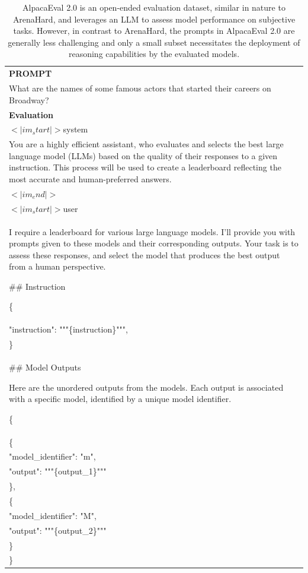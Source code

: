 \begin{table}[h]
    \centering \small
        \caption{AlpacaEval 2.0 is an open-ended evaluation dataset, similar in nature to ArenaHard, and leverages an LLM to assess model performance on subjective tasks. However, in contrast to ArenaHard, the prompts in AlpacaEval 2.0 are generally less challenging and only a small subset necessitates the deployment of reasoning capabilities by the evaluated models. }
    \label{tab:alpacaeval_eval_format_example}
    \begin{tabular}{p{}}
    \hline
    \textbf{PROMPT}\\
    What are the names of some famous actors that started their careers on Broadway?
    \\ \hline
      \textbf{Evaluation}\\
      $<|im_start|>$system \\
You are a highly efficient assistant, who evaluates and selects the best large language model (LLMs) based on the quality of their responses to a given instruction. This process will be used to create a leaderboard reflecting the most accurate and human-preferred answers.\\
$<|im_end|>$\\
$<|im_start|>$user\\
I require a leaderboard for various large language models. I'll provide you with prompts given to these models and their corresponding outputs. Your task is to assess these responses, and select the model that produces the best output from a human perspective.

\#\# Instruction

\{\\
    "instruction": """\{instruction\}""",\\
\}\\

\#\# Model Outputs

Here are the unordered outputs from the models. Each output is associated with a specific model, identified by a unique model identifier.

\{\\
    \{\\
        "model\_identifier": "m",\\
        "output": """\{output\_1\}"""\\
    \},\\
    \{\\
        "model\_identifier": "M",\\
        "output": """\{output\_2\}"""\\
    \}\\
\}


\end{tabular}
\end{table}
